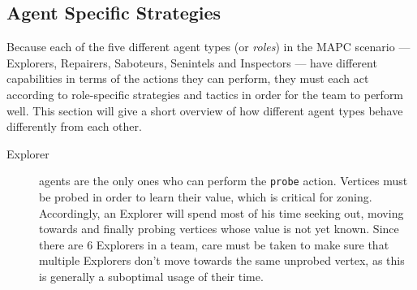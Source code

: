 \subsection{Agent Specific Strategies}\label{alg:agentstrategies}
Because each of the five different agent types (or \emph{roles}) in the MAPC scenario --- Explorers, Repairers, Saboteurs, Senintels and Inspectors --- have different capabilities in terms of the actions they can perform, they must each act according to role-specific strategies and tactics in order for the team to perform well.
This section will give a short overview of how different agent types behave differently from each other.
\begin{description}
    \item[Explorer] agents are the only ones who can perform the \texttt{probe} action.
        Vertices must be probed in order to learn their value, which is critical for zoning.
        Accordingly, an Explorer will spend most of his time seeking out, moving towards and finally probing vertices whose value is not yet known.
        Since there are 6 Explorers in a team, care must be taken to make sure that multiple Explorers don't move towards the same unprobed vertex, as this is generally a suboptimal usage of their time.


\end{description}

